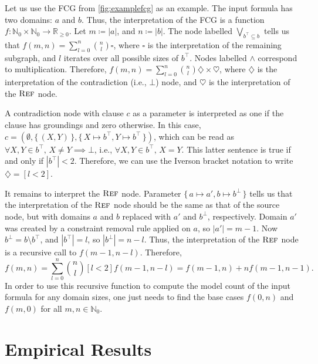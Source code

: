 \begin{example}\label{example:interpretation}
  Let us use the FCG from \cref{fig:examplefcg} as an example. The input formula
  has two domains: $a$ and $b$. Thus, the interpretation of the FCG is a
  function
  $f\colon \mathbb{N}_{0} \times \mathbb{N}_{0} \to \mathbb{R}_{\ge 0}$. Let
  $m \coloneqq |a|$, and $n \coloneqq |b|$. The node labelled
  $\bigvee_{b^{\top} \subseteq b}$ tells us that
  $f(m, n) = \sum_{l = 0}^{n} \binom{n}{l} \square$, where $\square$ is the
  interpretation of the remaining subgraph, and $l$ iterates over all possible
  sizes of $b^{\top}$. Nodes labelled $\land$ correspond to multiplication.
  Therefore,
  $f(m, n) = \sum_{l = 0}^{n} \binom{n}{l} \diamondsuit \times \heartsuit$,
  where $\diamondsuit$ is the interpretation of the contradiction (i.e., $\bot$)
  node, and $\heartsuit$ is the interpretation of the $\operatorname{\textsc{Ref}}$ node.

  A contradiction node with clause $c$ as a parameter is interpreted as one if
  the clause has groundings and zero otherwise. In this case,
  $c = (\emptyset, \{\, (X, Y) \,\}, \{\, X \mapsto b^\top, Y \mapsto b^\top \,\})$,
  which can be read as $\forall X, Y \in b^{\top}\text{,
  }X \ne Y \implies \bot$, i.e., $\forall X, Y \in b^{\top}\text{, }X = Y$. This
  latter sentence is true if and only if $|b^{\top}| < 2$. Therefore, we can use
  the Iverson bracket notation to write $\diamondsuit = [l < 2]$.

  It remains to interpret the $\operatorname{\textsc{Ref}}$ node. Parameter
  $\{\, a \mapsto a', b \mapsto b^\bot \,\}$ tells us that the interpretation of
  the $\operatorname{\textsc{Ref}}$ node should be the same as that of the source node, but with
  domains $a$ and $b$ replaced with $a'$ and $b^{\bot}$, respectively. Domain
  $a'$ was created by a constraint removal rule applied on $a$, so
  $|a'| = m - 1$. Now $b^{\bot} = b \setminus b^{\top}$, and $|b^{\top}| = l$,
  so $|b^{\bot}| = n - l$. Thus, the interpretation of the $\operatorname{\textsc{Ref}}$ node is a
  recursive call to $f(m - 1, n - l)$. Therefore,
  \begin{equation}\label{eq:solution}
    f(m, n) = \sum_{l = 0}^{n} \binom{n}{l} [l < 2] f(m-1, n-l) = f(m-1, n) + n f(m-1, n-1).
  \end{equation}
  In order to use this recursive function to compute the model count of the
  input formula for any domain sizes, one just needs to find the base cases
  $f(0, n)$ and $f(m, 0)$ for all $m, n \in \mathbb{N}_{0}$.
\end{example}

\section{Empirical Results}\label{sec:results} %

